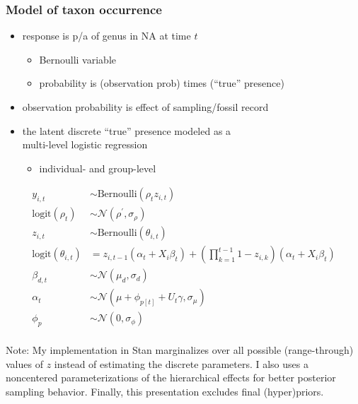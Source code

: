 \documentclass{beamer}
\begin{document}
\begin{frame}
  \frametitle{Model of taxon occurrence}
  \begin{itemize}
    \item response is p/a of genus in NA at time \(t\)
      \begin{itemize}
        \item Bernoulli variable 
        \item probability is (observation prob) times (``true'' presence)
      \end{itemize}
    \item observation probability is effect of sampling/fossil record
    \item the latent discrete ``true'' presence modeled as a \\multi-level logistic regression
      \begin{itemize}
        \item individual- and group-level
      \end{itemize}
  \end{itemize}
\end{frame}

\begin{frame}
  \begin{align*}
    y_{i,t} &\sim \text{Bernoulli}(\rho_{t} z_{i,t}) \\
    \text{logit}(\rho_{t}) &\sim \mathcal{N}(\rho^{'}, \sigma_{\rho}) \\
    z_{i,t} &\sim \text{Bernoulli}(\theta_{i, t}) \\
    \text{logit}(\theta_{i, t}) &= z_{i,t-1} (\alpha_{t} + X_{i} \beta_{t}) + (\prod_{k = 1}^{t-1} 1 - z_{i,k}) (\alpha_{t} + X_{i} \beta_{t}) \\
    \beta_{d,t} &\sim \mathcal{N}(\mu_{d}, \sigma_{d}) \\
    \alpha_{t} &\sim \mathcal{N}(\mu + \phi_{p[t]} + U_{t} \gamma, \sigma_{\mu}) \\
    \phi_{p} &\sim \mathcal{N}(0, \sigma_{\phi}) \\
  \end{align*}

  \scriptsize{Note: My implementation in Stan marginalizes over all possible (range-through) values of \(z\) instead of estimating the discrete parameters. I also uses a noncentered parameterizations of the hierarchical effects for better posterior sampling behavior. Finally, this presentation excludes final (hyper)priors.}
\end{frame}
\end{document}
